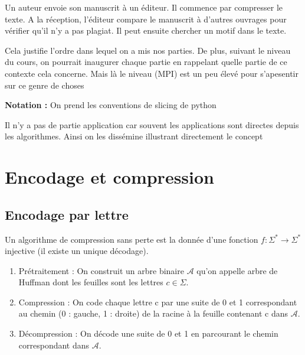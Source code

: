 
Un auteur envoie son manuscrit à un éditeur. Il commence par compresser le texte. A la réception, l'éditeur compare le manuscrit à d'autres ouvrages pour vérifier qu'il n'y a pas plagiat. Il peut ensuite chercher un motif dans le texte.

\begin{com}
	Cela justifie l'ordre dans lequel on a mis nos parties. De plus, suivant le niveau du cours, on pourrait inaugurer chaque partie en rappelant quelle partie de ce contexte cela concerne. Mais là le niveau (MPI) est un peu élevé pour s'apesentir sur ce genre de choses
\end{com}

\textbf{Notation :} On prend les conventions de slicing de python


\begin{com}
	Il n'y a pas de partie application car souvent les applications sont directes depuis les algorithmes. Ainsi on les dissémine illustrant directement le concept	
\end{com}


\section{Encodage et compression}

\subsection{Encodage par lettre}

\begin{definition}
	Un algorithme de compression sans perte est la donnée d'une fonction $f : \Sigma^* \to \Sigma^*$ injective (il existe un unique décodage). 
\end{definition}

\begin{algo}
	\enspace
	\begin{enumerate}
	\item Prétraitement : On construit un arbre binaire $\mathcal A$ qu’on appelle arbre de Huffman dont les feuilles sont les lettres $c \in \Sigma$.
	
	\item Compression : On code chaque lettre c par une suite de 0 et 1 correspondant au chemin (0 : gauche, 1 : droite) de la racine à la feuille contenant c dans $\mathcal A$.
	
	\item Décompression : On décode une suite de 0 et 1 en parcourant le chemin correspondant dans $\mathcal A$.
	\end{enumerate}
\end{algo}

